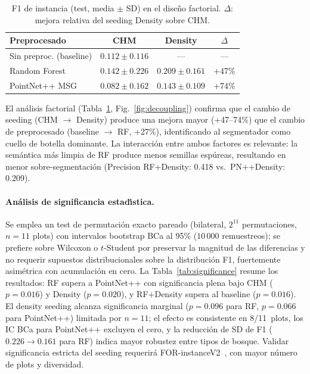 \documentclass[runningheads]{llncs}
\begin{document}
\begin{table}[H]
\centering
\caption{F1 de instancia (test, media $\pm$ SD) en el dise\~no factorial. $\Delta$: mejora relativa del seeding Density sobre CHM.}\label{tab:factorial}
\begin{tabular}{lccc}
\toprule
Preprocesado & CHM & Density & $\Delta$ \\
\midrule
Sin preproc. (baseline) & $0.112 \pm 0.116$ & ---   & ---   \\
Random Forest           & $0.142 \pm 0.226$ & $\mathbf{0.209 \pm 0.161}$ & +47\% \\
PointNet++ MSG          & $0.082 \pm 0.162$ & $0.143 \pm 0.109$ & +74\% \\
\bottomrule
\end{tabular}
\end{table}

El an\'alisis factorial (Tabla~\ref{tab:factorial}, Fig.~\ref{fig:decoupling}) confirma que el cambio de seeding (CHM $\rightarrow$ Density) produce una mejora mayor (+47--74\%) que el cambio de preprocesado (baseline $\rightarrow$ RF, +27\%), identificando al segmentador como cuello de botella dominante. La interacci\'on entre ambos factores es relevante: la sem\'antica m\'as limpia de RF produce menos semillas esp\'ureas, resultando en menor sobre-segmentaci\'on (Precision RF+Density: 0.418 vs.\ PN++Density: 0.209).

\paragraph{An\'alisis de significancia estad\'\i{}stica.}
Se emplea un test de permutaci\'on exacto pareado (bilateral, $2^{11}$ permutaciones, $n=11$ plots) con intervalos bootstrap BCa al 95\% ($10\,000$ remuestreos); se prefiere sobre Wilcoxon o $t$-Student por preservar la magnitud de las diferencias y no requerir supuestos distribucionales sobre la distribuci\'on F1, fuertemente asim\'etrica con acumulaci\'on en cero. La Tabla~\ref{tab:significance} resume los resultados: RF supera a PointNet++ con significancia plena bajo CHM ($p=0.016$) y Density ($p=0.020$), y RF+Density supera al baseline ($p=0.016$). El density seeding alcanza significancia marginal ($p=0.096$ para RF, $p=0.066$ para PointNet++) limitada por $n=11$; el efecto es consistente en 8/11~plots, los IC BCa para PointNet++ excluyen el cero, y la reducci\'on de SD de F1 ($0.226 \rightarrow 0.161$ para RF) indica mayor robustez entre tipos de bosque. Validar significancia estricta del seeding requerir\'a FOR-instanceV2~\cite{xiang2025}, con mayor n\'umero de plots y diversidad.
\end{document}
